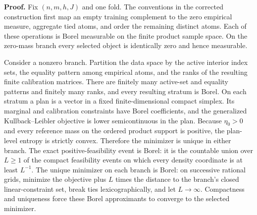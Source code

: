 \textbf{Proof.}
Fix \((n,m,h,J)\) and one fold. The conventions in the corrected construction first map an empty training complement to the zero empirical measure, aggregate tied atoms, and order the remaining distinct atoms. Each of these operations is Borel measurable on the finite product sample space. On the zero-mass branch every selected object is identically zero and hence measurable.

Consider a nonzero branch. Partition the data space by the active interior index sets, the equality pattern among empirical atoms, and the ranks of the resulting finite calibration matrices. There are finitely many active-set and equality patterns and finitely many ranks, and every resulting stratum is Borel. On each stratum a plan is a vector in a fixed finite-dimensional compact simplex. Its marginal and calibration constraints have Borel coefficients, and the generalized Kullback--Leibler objective is lower semicontinuous in the plan. Because \(\eta_0>0\) and every reference mass on the ordered product support is positive, the plan-level entropy is strictly convex. Therefore the minimizer is unique in either branch. The exact positive-feasibility event is Borel: it is the countable union over \(L\ge1\) of the compact feasibility events on which every density coordinate is at least \(L^{-1}\). The unique minimizer on each branch is Borel: on successive rational grids, minimize the objective plus \(L\) times the distance to the branch's closed linear-constraint set, break ties lexicographically, and let \(L\to\infty\). Compactness and uniqueness force these Borel approximants to converge to the selected minimizer.

